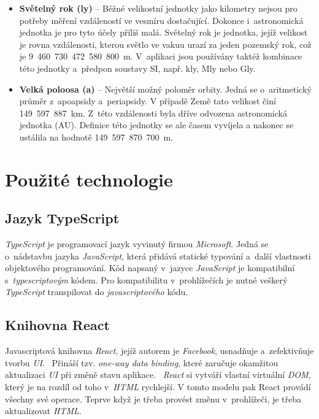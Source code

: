 \documentclass[a4paper,12pt]{article}
\begin{document}
\begin{itemize}
\item \textbf{Světelný rok (ly)} -- Běžné velikostní jednotky jako kilometry nejsou pro potřeby měření vzdáleností ve vesmíru dostačující. Dokonce i~astronomická jednotka je pro tyto účely příliš malá. Světelný rok je jednotka, jejíž velikost je rovna vzdálenosti, kterou světlo ve vakuu urazí za jeden pozemský rok, což je 9~460~730~472~580~800~m. V~aplikaci jsou používány taktéž kombinace této jednotky a~předpon soustavy SI, např. kly, Mly nebo Gly.~\cite{kleczek}

\item \textbf{Velká poloosa (a)} -- Největší možný poloměr orbity. Jedná se o~aritmetický průměr z~apoapsidy a~periapsidy. V případě Země tato velikost činí 149~597~887~km. Z~této vzdálenosti byla dříve odvozena astronomická jednotka (AU). Definice této jednotky se ale časem vyvíjela a nakonec se ustálila na hodnotě 149~597~870~700~m.~\cite{kleczek}
\end{itemize}

\section{Použité technologie}

\subsection{Jazyk TypeScript}

\textit{TypeScript} je programovací jazyk vyvinutý firmou \textit{Microsoft}. Jedná se o~nádstavbu jazyka \textit{JavaScript}, která přidává statické typování a~další vlastnosti objektového programování. Kód napsaný v~jazyce \textit{JavaScript} je kompatibilní s~\textit{typescriptovým} kódem. Pro kompatibilitu v~prohlížečích je nutné veškerý \textit{TypeScript} transpilovat do \textit{javascriptového} kódu.~\cite{typescript}

\subsection{Knihovna React}

Javascriptová knihovna \textit{React}, jejíž autorem je \textit{Facebook}, usnadňuje a~zefektivňuje tvorbu \textit{UI}.~\cite{reactbook} Přináší tzv. \textit{one-way data binding}, které zaručuje okamžitou aktualizaci \textit{UI} při změně stavu aplikace.~\cite{onewaydatabinding} \textit{React} si vytváří vlastní virtuální \textit{DOM}, který je na rozdíl od toho v~\textit{HTML} rychlejší. V tomto modelu pak React provádí všechny své operace. Teprve když je třeba provést změnu v~prohlížeči, je třeba  aktualizovat \textit{HTML}.~\cite{reactbook}
\end{document}
